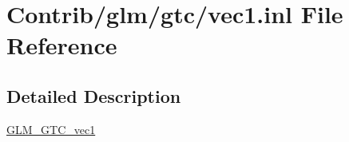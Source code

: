 \hypertarget{gtc_2vec1_8inl}{}\section{Contrib/glm/gtc/vec1.inl File Reference}
\label{gtc_2vec1_8inl}


\subsection{Detailed Description}
\mbox{\hyperlink{group__gtc__vec1}{G\+L\+M\+\_\+\+G\+T\+C\+\_\+vec1}} 